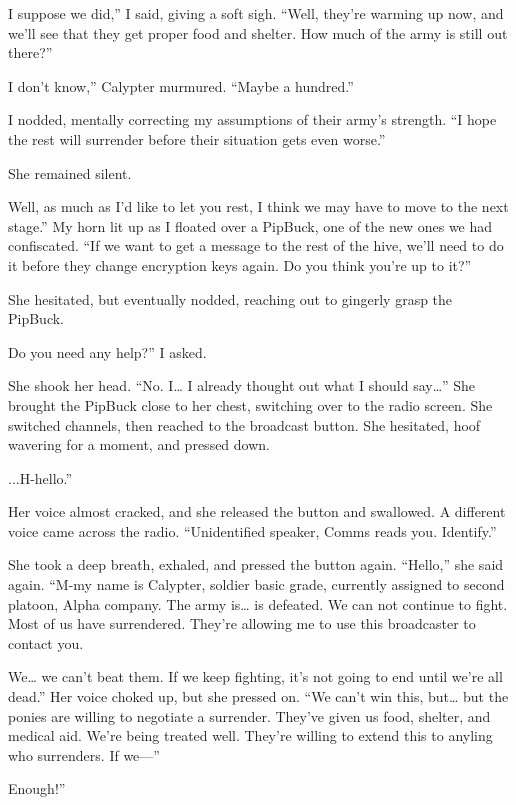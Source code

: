 \leavevmode{}I suppose we did,” I said, giving a soft sigh. “Well, they’re warming up now, and we’ll see that they get proper food and shelter. How much of the army is still out there?”

\leavevmode{}I don’t know,” Calypter murmured. “Maybe a hundred.”

I nodded, mentally correcting my assumptions of their army’s strength. “I hope the rest will surrender before their situation gets even worse.”

She remained silent.

\leavevmode{}Well, as much as I’d like to let you rest, I think we may have to move to the next stage.” My horn lit up as I floated over a PipBuck, one of the new ones we had confiscated. “If we want to get a message to the rest of the hive, we’ll need to do it before they change encryption keys again. Do you think you’re up to it?”

She hesitated, but eventually nodded, reaching out to gingerly grasp the PipBuck.

\leavevmode{}Do you need any help?” I asked.

She shook her head. “No. I… I already thought out what I should say…” She brought the PipBuck close to her chest, switching over to the radio screen. She switched channels, then reached to the broadcast button. She hesitated, hoof wavering for a moment, and pressed down.

\leavevmode{}...H-hello.”

Her voice almost cracked, and she released the button and swallowed. A different voice came across the radio. “Unidentified speaker, Comms reads you. Identify.”

She took a deep breath, exhaled, and pressed the button again. “Hello,” she said again. “M-my name is Calypter, soldier basic grade, currently assigned to second platoon, Alpha company. The army is… is defeated. We can not continue to fight. Most of us have surrendered. They’re allowing me to use this broadcaster to contact you.

\leavevmode{}We… we can’t beat them. If we keep fighting, it’s not going to end until we’re all dead.” Her voice choked up, but she pressed on. “We can’t win this, but… but the ponies are willing to negotiate a surrender. They’ve given us food, shelter, and medical aid. We’re being treated well. They’re willing to extend this to anyling who surrenders. If we—”

\leavevmode{}Enough!”

